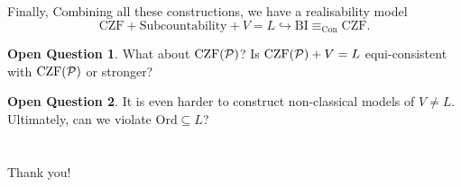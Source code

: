 \documentclass{beamer}
\makeatletter
\def\beamer@writeslidentry@miniframesoff{%
  \expandafter\beamer@ifempty\expandafter{\beamer@framestartpage}{}%
  {%
    \clearpage\beamer@notesactions%
  }
}
\newcommand*{\miniframesoff}{\let\beamer@writeslidentry=\beamer@writeslidentry@miniframesoff}
\theoremstyle{definition}
\newtheorem{oquestion}{Open Question}
\newcommand{\CZF}{\mathrm{CZF}}
\newcommand{\CZFP}{\CZF\mleft(\mathcal{P}\mright)}
\newcommand{\Ord}{\mathrm{Ord}}
\makeatother
\begin{document}
\begin{frame}{Finally,}
  Combining all these constructions, we have a realisability model
  \[\CZF + \text{Subcountability} + V = L \hookrightarrow \mathrm{BI} \equiv_{\mathrm{Con}} \CZF.\]

  \pause

  \begin{oquestion}
    What about $\CZFP$? Is $\CZFP + V = L$ equi-consistent with $\CZFP$ or stronger?
  \end{oquestion}

  \begin{oquestion}
    It is even harder to construct non-classical models of $V \neq L$. Ultimately, can we violate $\Ord \subseteq L$?
  \end{oquestion}
\end{frame}

\miniframesoff

\section*{}

\begin{frame}
  \Large Thank you!
\end{frame}

\begin{frame}[allowframebreaks=1]
  \renewcommand{\section}[2]{}
  \bibmain
\end{frame}
\end{document}
